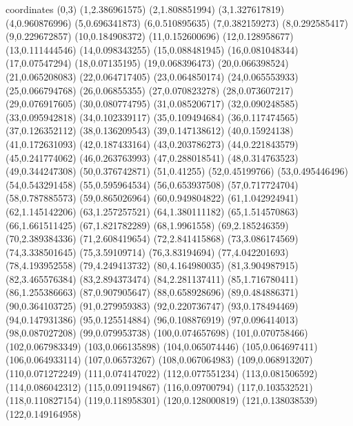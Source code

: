  coordinates {
    (0,3)
    (1,2.386961575)
    (2,1.808851994)
    (3,1.327617819)
    (4,0.960876996)
    (5,0.696341873)
    (6,0.510895635)
    (7,0.382159273)
    (8,0.292585417)
    (9,0.229672857)
    (10,0.184908372)
    (11,0.152600696)
    (12,0.128958677)
    (13,0.111444546)
    (14,0.098343255)
    (15,0.088481945)
    (16,0.081048344)
    (17,0.07547294)
    (18,0.07135195)
    (19,0.068396473)
    (20,0.066398524)
    (21,0.065208083)
    (22,0.064717405)
    (23,0.064850174)
    (24,0.065553933)
    (25,0.066794768)
    (26,0.06855355)
    (27,0.070823278)
    (28,0.073607217)
    (29,0.076917605)
    (30,0.080774795)
    (31,0.085206717)
    (32,0.090248585)
    (33,0.095942818)
    (34,0.102339117)
    (35,0.109494684)
    (36,0.117474565)
    (37,0.126352112)
    (38,0.136209543)
    (39,0.147138612)
    (40,0.15924138)
    (41,0.172631093)
    (42,0.187433164)
    (43,0.203786273)
    (44,0.221843579)
    (45,0.241774062)
    (46,0.263763993)
    (47,0.288018541)
    (48,0.314763523)
    (49,0.344247308)
    (50,0.376742871)
    (51,0.41255)
    (52,0.45199766)
    (53,0.495446496)
    (54,0.543291458)
    (55,0.595964534)
    (56,0.653937508)
    (57,0.717724704)
    (58,0.787885573)
    (59,0.865026964)
    (60,0.949804822)
    (61,1.042924941)
    (62,1.145142206)
    (63,1.257257521)
    (64,1.380111182)
    (65,1.514570863)
    (66,1.661511425)
    (67,1.821782289)
    (68,1.9961558)
    (69,2.185246359)
    (70,2.389384336)
    (71,2.608419654)
    (72,2.841415868)
    (73,3.086174569)
    (74,3.338501645)
    (75,3.59109714)
    (76,3.83194694)
    (77,4.042201693)
    (78,4.193952558)
    (79,4.249413732)
    (80,4.164980035)
    (81,3.904987915)
    (82,3.465576384)
    (83,2.894373474)
    (84,2.281137411)
    (85,1.716780411)
    (86,1.255386663)
    (87,0.907905647)
    (88,0.658928696)
    (89,0.484886371)
    (90,0.364103725)
    (91,0.279959383)
    (92,0.220736747)
    (93,0.178494469)
    (94,0.147931386)
    (95,0.125514884)
    (96,0.108876919)
    (97,0.096414013)
    (98,0.087027208)
    (99,0.079953738)
    (100,0.074657698)
    (101,0.070758466)
    (102,0.067983349)
    (103,0.066135898)
    (104,0.065074446)
    (105,0.064697411)
    (106,0.064933114)
    (107,0.06573267)
    (108,0.067064983)
    (109,0.068913207)
    (110,0.071272249)
    (111,0.074147022)
    (112,0.077551234)
    (113,0.081506592)
    (114,0.086042312)
    (115,0.091194867)
    (116,0.09700794)
    (117,0.103532521)
    (118,0.110827154)
    (119,0.118958301)
    (120,0.128000819)
    (121,0.138038539)
    (122,0.149164958)
}
